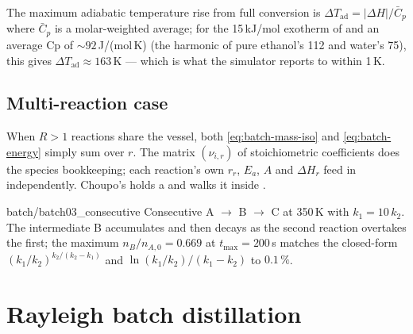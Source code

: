 \documentclass[11pt,a4paper]{article}
\begin{document}
The maximum adiabatic temperature rise from full conversion is
\(\Delta T_{\mathrm{ad}} = |\Delta H| / \bar{C}_p\) where
$\bar{C}_p$ is a molar-weighted average; for the 15\,kJ/mol exotherm
of  and an average Cp of $\sim 92$\,J/(mol\,K)
(the harmonic of pure ethanol's 112 and water's 75), this gives
$\Delta T_{\mathrm{ad}} \approx 163$\,K --- which is what the
simulator reports to within 1\,K.

\subsection*{Multi-reaction case}

When $R > 1$ reactions share the vessel, both \eqref{eq:batch-mass-iso}
and \eqref{eq:batch-energy} simply sum over $r$.  The matrix
$(\nu_{i,r})$ of stoichiometric coefficients does the species
bookkeeping; each reaction's own $r_r$, $E_a$, $A$ and $\Delta H_r$
feed in independently.  Choupo's  holds a
 and walks it inside
.

\begin{tutoriallink}{batch/batch03\_consecutive}
Consecutive A $\to$ B $\to$ C at 350\,K with $k_1 = 10\,k_2$.  The
intermediate B accumulates and then decays as the second reaction
overtakes the first; the maximum $n_B / n_{A,0} = 0.669$ at
$t_{\max} = 200$\,s matches the closed-form
$(k_1/k_2)^{k_2/(k_2-k_1)}$ and $\ln(k_1/k_2)/(k_1-k_2)$ to
$0.1\,\%$.
\end{tutoriallink}

\section{Rayleigh batch distillation}\label{ch:rayleigh}
\end{document}
